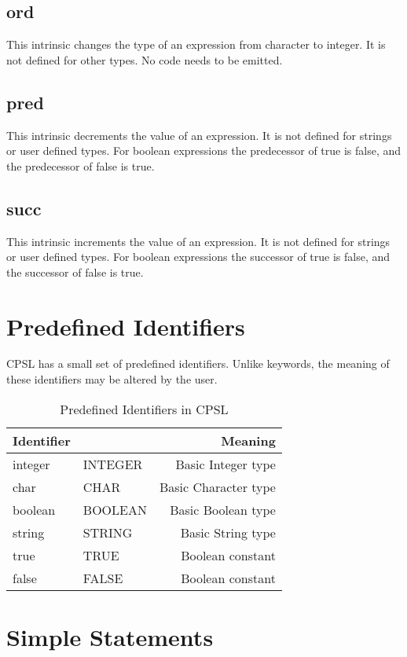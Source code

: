\documentclass{book}
\begin{document}
\subsection{ord}
This intrinsic changes the type of an expression from character to integer.
It is not defined for other types.
No code needs to be emitted.
\subsection{pred}
This intrinsic decrements the value of an expression.
It is not defined for strings or user defined types.
For boolean expressions the predecessor of true is false, and the predecessor of false is true.
\subsection{succ}
This intrinsic increments the value of an expression.
It is not defined for strings or user defined types.
For boolean expressions the successor of true is false, and the successor of false is true.

\section{Predefined Identifiers}
CPSL has a small set of predefined identifiers.
Unlike keywords, the meaning of these identifiers may be altered by the user.

\begin{table}[h!]
\begin{center}
\begin{tabular}{ll|r}
Identifier & & Meaning \\
\hline
integer & INTEGER & Basic Integer type \\
char & CHAR & Basic Character type \\
boolean & BOOLEAN & Basic Boolean type \\
string & STRING & Basic String type \\
true & TRUE & Boolean constant \\
false & FALSE & Boolean constant \\
\end{tabular}
\end{center}
\caption{Predefined Identifiers in CPSL}
\label{predefinedident}
\end{table}

\section{Simple Statements}
\end{document}
